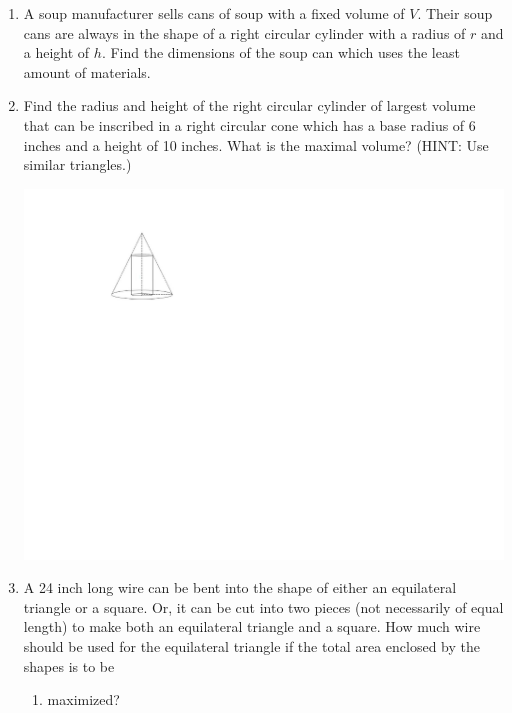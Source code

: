 \documentclass[12pt]{article}
\newif\ifans
\begin{document}
\begin{enumerate}
\item A soup manufacturer sells cans of soup with a fixed volume of $V$.  Their soup cans are always in the shape of a right circular cylinder with a radius of $r$ and a height of $h$.  Find the dimensions of the soup can which uses the least amount of materials.

\ifans{\fbox{$r=\sqrt[3]{\frac{V}{2\pi}}$ and $h=\sqrt[3]{\frac{4V}{\pi}}$}} \fi

\item Find the radius and height of the right circular cylinder of largest volume that can be inscribed in a right circular cone which has a base radius of 6 inches and a height of 10 inches.  What is the maximal volume?  (HINT: Use similar triangles.)
\begin{center}
\includegraphics[scale=1]{cone.pdf}
\end{center}

\ifans{\fbox{$r=4$ inches, $h=\frac{10}{3}$ inches, and $V=\frac{160\pi}{3}$ cubic inches.}} \fi

\item A 24 inch long wire can be bent into the shape of either an equilateral triangle or a square.  Or, it can be cut into two pieces (not necessarily of equal length) to make both an equilateral triangle and a square.  How much wire should be used for the equilateral triangle if the total area enclosed by the shapes is to be

\begin{enumerate}

\item maximized?


\end{enumerate}
\end{enumerate}
\end{document}
